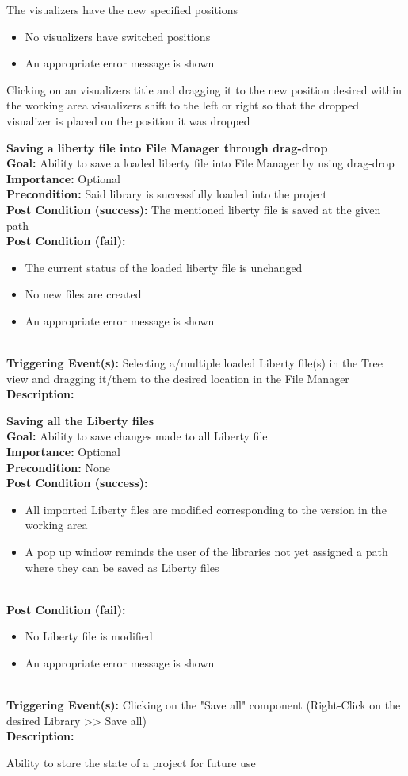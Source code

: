 \documentclass[10pt,a4paper]{report}
\newcommand{\precondition}[1]{
    \textbf{Precondition: } #1 \leavevmode \\
}
\newcommand{\FRDescription}[8]{
    \textbf{#1} \leavevmode \\
    \textbf{Goal: } #2 \leavevmode \\
    \textbf{Importance: } #3 \leavevmode \\
    \precondition{#4}
    \textbf{Post Condition (success): } #5 \leavevmode \\
    \textbf{Post Condition (fail): } #6 \leavevmode \\
    \textbf{Triggering Event(s): } #7 \leavevmode \\
    \textbf{Description: } \leavevmode \\ 
    #8}
\newcommand{\FRODescription}[8]{
    \textbf{#1} \leavevmode \\
    \textbf{Goal: } #2 \leavevmode \\
    \textbf{Importance: } #3 \leavevmode \\
    \precondition{#4}
    \textbf{Post Condition (success): } #5 \leavevmode \\
    \textbf{Post Condition (fail): } #6 \leavevmode \\
    \textbf{Triggering Event(s): } #7 \leavevmode \\
    \textbf{Description: } \leavevmode \\
    #8}
\begin{document}
\begin{FRO}
    {The visualizers have the new specified positions}
    {\begin{itemize}
        \item No visualizers have switched positions
        \item An appropriate error message is shown
    \end{itemize}}
    {Clicking on an visualizers title and dragging it to the new position desired within the working area}
    {visualizers shift to the left or right so that the dropped visualizer is placed on the position it was dropped}
    \item \FRODescription{Saving a liberty file into File Manager through drag-drop}
    {Ability to save a loaded liberty file into File Manager by using drag-drop}
    {Optional}
    {Said library is successfully loaded into the project}
    {The mentioned liberty file is saved at the given path}
    {\begin{itemize}
        \item The current status of the loaded liberty file is unchanged
        \item No new files are created
        \item An appropriate error message is shown
    \end{itemize}}
    {Selecting a/multiple loaded Liberty file(s) in the Tree view and dragging it/them to the desired location in the File Manager}
    \item \FRDescription{Saving all the Liberty files}
    {Ability to save changes made to all Liberty file}
    {Optional}
    {None}
    {\begin{itemize}
        \item All imported Liberty files are modified corresponding to the version in the working area
        \item A pop up window reminds the user of the libraries not yet assigned a path where they can be saved as Liberty files
    \end{itemize}}
    {\begin{itemize}
        \item No Liberty file is modified
        \item An appropriate error message is shown
    \end{itemize}}
    {Clicking on the "Save all" component (Right-Click on the desired Library  >> Save all)}
    \item {}
    {Ability to store the state of a project for future use}

\end{FRO}
\end{document}
